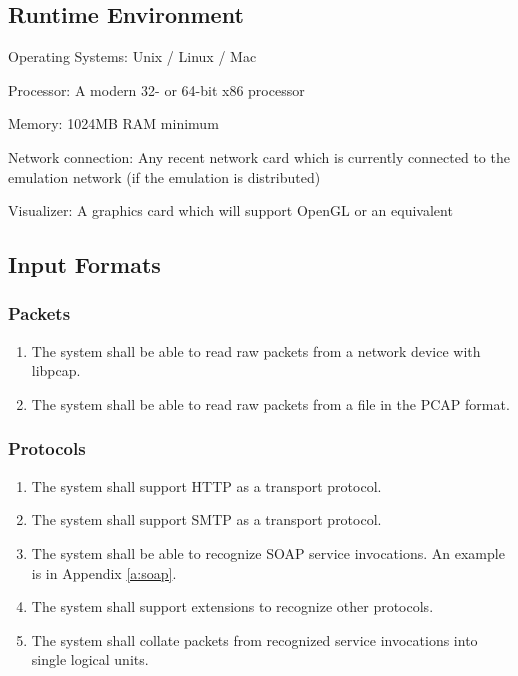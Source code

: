 \documentclass[titlepage]{article}
\begin{document}

\subsection{Runtime Environment} 
\begin{itemize*}
    \item Operating Systems:  Unix / Linux / Mac
    \item Processor:  A modern 32- or 64-bit x86 processor
    \item Memory:  1024MB RAM minimum
    \item Network connection:  Any recent network card which is currently connected to the emulation network (if the emulation is distributed)
    \item Visualizer:  A graphics card which will support OpenGL or an equivalent
\end{itemize*}


\subsection{Input Formats%
  \label{input-formats}%
}

\subsubsection{Packets}
\begin{enumerate}
    \item The system shall be able to read raw packets from a network device
        with libpcap.
    \item The system shall be able to read raw packets from a file in the PCAP
        format.
\end{enumerate}

\subsubsection{Protocols}
\begin{enumerate}
    \item The system shall support HTTP as a transport protocol.
    \item The system shall support SMTP as a transport protocol.
    \item The system shall be able to recognize SOAP service invocations.  An
        example is in Appendix \ref{a:soap}.
    \item The system shall support extensions to recognize other protocols.
    \item The system shall collate packets from recognized service invocations
        into single logical units.
\end{enumerate}
\end{document}
